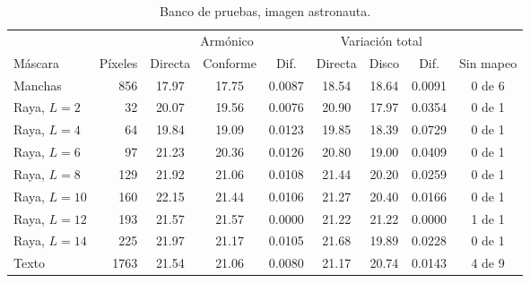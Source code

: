 \begin{table}[ht]
  \centering
  \caption{Banco de pruebas, imagen astronauta.}
  \label{tab:anexo-astronauta}
  \small
  \begin{tabular}{@{}lrccccccc@{}}
    \toprule
    & & \multicolumn{3}{c}{Armónico} & \multicolumn{3}{c}{Variación total} & \\
    \cmidrule(lr){3-5}\cmidrule(lr){6-8}
    Máscara & Píxeles & Directa & Conforme & Dif. & Directa & Disco & Dif. & Sin mapeo \\
    \midrule
    Manchas & 856 & 17.97 & 17.75 & 0.0087 & 18.54 & 18.64 & 0.0091 & 0 de 6 \\
    Raya, $L=2$ & 32 & 20.07 & 19.56 & 0.0076 & 20.90 & 17.97 & 0.0354 & 0 de 1 \\
    Raya, $L=4$ & 64 & 19.84 & 19.09 & 0.0123 & 19.85 & 18.39 & 0.0729 & 0 de 1 \\
    Raya, $L=6$ & 97 & 21.23 & 20.36 & 0.0126 & 20.80 & 19.00 & 0.0409 & 0 de 1 \\
    Raya, $L=8$ & 129 & 21.92 & 21.06 & 0.0108 & 21.44 & 20.20 & 0.0259 & 0 de 1 \\
    Raya, $L=10$ & 160 & 22.15 & 21.44 & 0.0106 & 21.27 & 20.40 & 0.0166 & 0 de 1 \\
    Raya, $L=12$ & 193 & 21.57 & 21.57 & 0.0000 & 21.22 & 21.22 & 0.0000 & 1 de 1 \\
    Raya, $L=14$ & 225 & 21.97 & 21.17 & 0.0105 & 21.68 & 19.89 & 0.0228 & 0 de 1 \\
    Texto & 1763 & 21.54 & 21.06 & 0.0080 & 21.17 & 20.74 & 0.0143 & 4 de 9 \\
    \bottomrule
  \end{tabular}
  \propia
\end{table}

